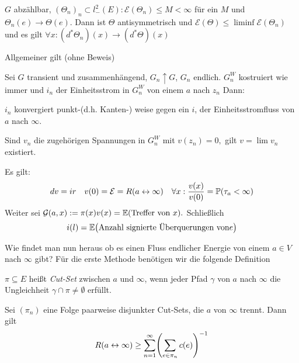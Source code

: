 \begin{uebung}
	$G$ abzählbar, $(\Theta_n)_n \subset l^2_-(E): \mathcal{E}(\Theta_n) \leq M < \infty$ für ein $M$ und $\Theta_n(e) \to \Theta(e)$. Dann ist $\Theta$ antisymmetrisch und $\mathcal{E}(\Theta) \leq \liminf \mathcal{E}(\Theta_n)$ und es gilt $ \forall x: (d^*\Theta_n)(x) \to (d^*\Theta)(x)$
\end{uebung}

Allgemeiner gilt (ohne Beweis)

	\begin{satz}
		Sei $G$ transient und zusammenhängend, $G_n \uparrow G$, $G_n$ endlich. $G_n^W$ kostruiert wie immer und $i_n$ der Einheitsstrom in $G^W_n$ von einem $a$ nach $z_n$ Dann:
		
		$i_n$ konvergiert punkt-(d.h. Kanten-) weise gegen ein $i$, der Einheitsstromfluss von $a$ nach $\infty$.

	Sind $v_n$ die zugehörigen Spannungen in $G^W_n$ mit $v(z_n) = 0,$ gilt $v  = \lim v_n$ existiert.

	Es gilt:
	\begin{align}
		dv = ir && v(0) = \mathcal{E} = R(a \leftrightarrow \infty) && \forall x: \frac{v(x)}{v(0)} = \prop{\tau_a < \infty}
	\end{align}
	Weiter sei $\mathcal{G}(a,x) := \pi(x)v(x) = \EW{\text{Treffer von }x}.$ Schließlich 
	\begin{equation}
		i(l) = \EW{\text{Anzahl signierte Überquerungen von}e} 
	\end{equation}

\end{satz}
Wie findet man nun heraus ob es einen Fluss endlicher Energie von einem $a\in V$ nach $\infty$ gibt? Für die erste Methode benötigen wir die folgende Definition
\begin{definition}
	$\pi \subseteq E$ heißt \emph{Cut-Set} zwischen $a$ und $\infty$, wenn jeder Pfad $\gamma$ von $a$ nach $\infty$ die Ungleichheit $\gamma \cap \pi \neq \emptyset$ erfüllt.
\end{definition}

\begin{satz}
	\label{satz:Nash-Williams}
	Sei $(\pi_n)$ eine Folge paarweise disjunkter Cut-Sets, die $a$ von $\infty$ trennt. Dann gilt 
	\begin{align}
		R(a \leftrightarrow \infty) \geq \sum\limits_{n = 1}^{\infty}\enb{\sum\limits_{e \in \pi_n} c(e)}^{-1}
	\end{align}
\end{satz}

